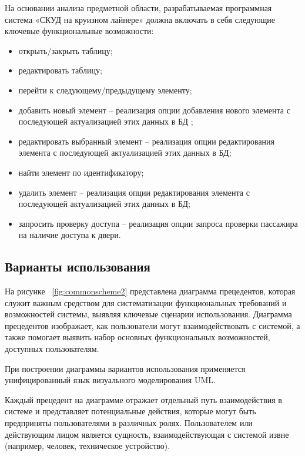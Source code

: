 На основании анализа предметной области, разрабатываемая программная система «СКУД на круизном лайнере» должна включать в себя следующие ключевые функциональные возможности:
\begin{itemize}
	\item открыть/закрыть таблицу;
	\item редактировать таблицу;
	\item перейти к следующему/предыдущему элементу;
	\item добавить новый элемент -- реализация опции добавления нового элемента с последующей актуализацией этих данных в БД ;
	\item редактировать выбранный элемент -- реализация опции редактирования элемента с последующей актуализацией этих данных в БД;
	\item найти элемент по идентификатору;
	\item удалить элемент -- реализация опции редактирования элемента с последующей актуализацией этих данных в БД;
	\item запросить проверку доступа -- реализация опции запроса проверки пассажира на наличие доступа к двери.
\end{itemize}

\subsection{Варианты использования}

На рисунке  ~\ref{fig:commonscheme2} представлена диаграмма прецедентов, которая служит важным средством для систематизации функциональных требований и возможностей системы, выявляя ключевые сценарии использования. Диаграмма прецедентов изображает, как пользователи могут взаимодействовать с системой, а также помогает выявить набор основных функциональных возможностей, доступных пользователям.

При построении диаграммы вариантов использования применяется унифицированный язык визуального моделирования UML.

Каждый прецедент на диаграмме отражает отдельный путь взаимодействия в системе и представляет потенциальные действия, которые могут быть предприняты пользователями в различных ролях. Пользователем или действующим лицом является сущность, взаимодействующая с системой извне (например, человек, техническое устройство).


